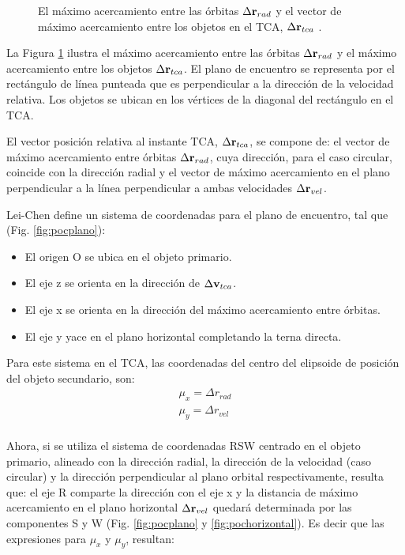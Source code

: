 \begin{figure}[!h]
\begin{minipage}[t]{0.48\textwidth}
 \caption[]{El m\'aximo acercamiento entre las \'orbitas $\Delta {\bf{r}}_{rad}$ y el vector de m\'aximo acercamiento entre los objetos en el TCA, $\Delta {\bf{r}}_{tca}$ \citep{leichen}.}
 \label{fig:pocdistancia}
\end{minipage}
\end{figure}

La Figura \ref{fig:pocdistancia} ilustra el m\'aximo acercamiento entre las \'orbitas $\Delta {\bf{r}}_{rad}$ y el m\'aximo acercamiento entre los objetos $\Delta {\bf{r}}_{tca}$. El plano de encuentro se representa por el rect\'angulo de l\'inea punteada que es perpendicular a la direcci\'on de la velocidad relativa. Los objetos se ubican en los v\'ertices de la diagonal del rect\'angulo en el TCA.

El vector posici\'on relativa al instante TCA, $\Delta {\bf{r}}_{tca}$, se compone de: el vector de m\'aximo acercamiento entre \'orbitas $\Delta {\bf{r}}_{rad}$, cuya direcci\'on, para el caso circular, coincide con la direcci\'on radial y el vector de m\'aximo acercamiento en el plano perpendicular a la l\'inea perpendicular a ambas velocidades $\Delta {\bf{r}}_{vel}$.

Lei-Chen define un sistema de coordenadas para el plano de encuentro, tal que (Fig. \ref{fig:pocplano}):
\begin{itemize}
 \item El origen O se ubica en el objeto primario.
 \item El eje z se orienta en la direcci\'on de $\Delta {\bf{v}}_{tca}$.
 \item El eje x se orienta en la direcci\'on del m\'aximo acercamiento entre \'orbitas.
 \item El eje y yace en el plano horizontal completando la terna directa.
\end{itemize}

Para este sistema en el TCA, las coordenadas del centro del elipsoide de posici\'on del objeto secundario, son:\\
% 
\begin{gather}
 \mu_{x}=\Delta r_{rad}\\
 \mu_{y}=\Delta r_{vel}\\
\end{gather}

Ahora, si se utiliza el sistema de coordenadas RSW centrado en el objeto primario, alineado con la direcci\'on radial, la direcci\'on de la velocidad (caso circular) y la direcci\'on perpendicular al plano orbital respectivamente, resulta que: 
el eje R comparte la direcci\'on con el eje x y la distancia de m\'aximo acercamiento en el plano horizontal $\Delta {\bf{r}}_{vel}$ quedar\'a determinada por las componentes S y W (Fig. \ref{fig:pocplano} y \ref{fig:pochorizontal}).  Es decir que las expresiones para $\mu_{x}$ y $\mu_{y}$, resultan:

